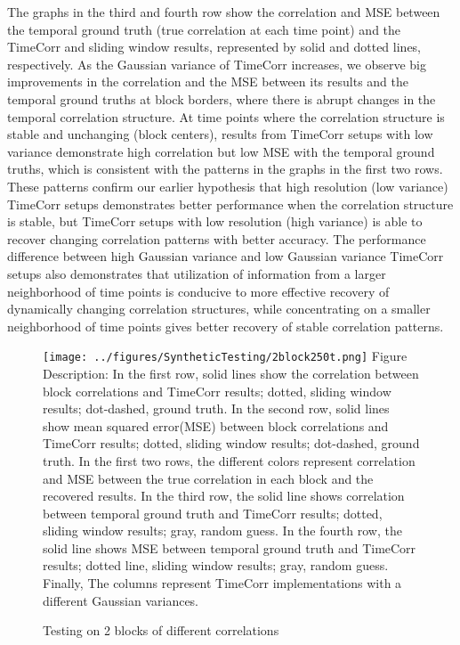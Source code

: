 \documentclass[11pt]{article}
\begin{document}
The graphs in the third and fourth row show the correlation and MSE between the temporal ground truth (true correlation at each time point) and the TimeCorr and sliding window results, represented by solid and dotted lines, respectively. As the Gaussian variance of TimeCorr increases, we observe big improvements in the correlation and the MSE between its results and the temporal ground truths at block borders, where there is abrupt changes in the temporal correlation structure. At time points where the correlation structure is stable and unchanging (block centers), results from TimeCorr setups with low variance demonstrate high correlation but low MSE with the temporal ground truths, which is consistent with the patterns in the graphs in the first two rows. These patterns confirm our earlier hypothesis that high resolution (low variance) TimeCorr setups demonstrates better performance when the correlation structure is stable, but TimeCorr setups with low resolution (high variance) is able to recover changing correlation patterns with better accuracy. The performance difference between high Gaussian variance and low Gaussian variance TimeCorr setups also demonstrates that utilization of information from a larger neighborhood of time points is conducive to more effective recovery of dynamically changing correlation structures, while concentrating on a smaller neighborhood of time points gives better recovery of stable correlation patterns.

\begin{figure}[!htb]
\caption{Testing on 2 blocks of different correlations}
\texttt{[image: ../figures/SyntheticTesting/2block250t.png]}
\label{fig:2block250t}
Figure Description: In the first row, solid lines show the correlation between block correlations and TimeCorr results; dotted, sliding window results; dot-dashed, ground truth. In the second row, solid lines show mean squared error(MSE) between block correlations and TimeCorr results; dotted, sliding window results; dot-dashed, ground truth. In the first two rows, the different colors represent correlation and MSE between the true correlation in each block and the recovered results. In the third row, the solid line shows correlation between temporal ground truth and TimeCorr results; dotted, sliding window results; gray, random guess. In the fourth row, the solid line shows MSE between temporal ground truth and TimeCorr results; dotted line, sliding window results; gray, random guess. Finally, The columns represent TimeCorr implementations with a different Gaussian variances.
\end{figure}
\end{document}
